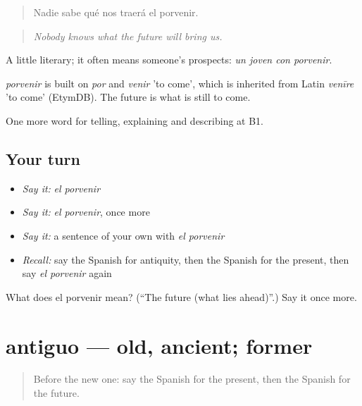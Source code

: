\begin{quote}
Nadie sabe qué nos traerá el porvenir.
\end{quote}

\begin{quote}
\emph{Nobody knows what the future will bring us.}
\end{quote}

A little literary; it often means someone's prospects: \emph{un joven con porvenir}.

\begin{cousinweb}
\emph{porvenir} is built on \emph{por} and \emph{venir} 'to come', which is inherited from Latin \emph{venīre} 'to come' (EtymDB). The future is what is still to come.
\end{cousinweb}

\begin{grammarlens}[title={What you've built}]
One more word for telling, explaining and describing at B1.
\end{grammarlens}

\subsection*{Your turn}
\begin{itemize}
\raggedright
  \item \emph{Say it:} \emph{el porvenir}
  \item \emph{Say it:} \emph{el porvenir}, once more
  \item \emph{Say it:} a sentence of your own with \emph{el porvenir}
  \item \emph{Recall:} say the Spanish for antiquity, then the Spanish for the present, then say \emph{el porvenir} again
\end{itemize}

\begin{tcolorbox}[breakable,colback=teal!4,colframe=teal!35!black,title={Before you move on}]
What does el porvenir mean? (\textquotedblleft{}The future (what lies ahead)\textquotedblright{}.) Say it once more.
\end{tcolorbox}
\section[antiguo]{antiguo — old, ancient; former}

\label{lesson:ES-C575-antiguo}



\begin{quote}
Before the new one: say the Spanish for the present, then the Spanish for the future.
\end{quote}

